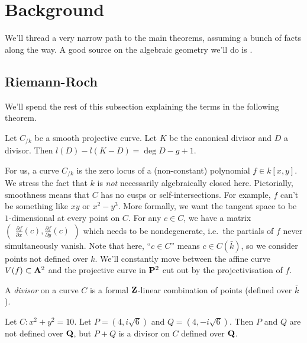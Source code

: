 
\section{Background}

We'll thread a very narrow path to the main theorems, assuming a bunch of 
facts along the way. A good source on the algebraic geometry we'll do is
\cite[ch.2,3]{silverman-2009}. 





\subsection{Riemann-Roch}

We'll spend the rest of this subsection explaining the terms in the following 
theorem. 

\begin{theorem}
Let $C_{/k}$ be a smooth projective curve. Let $K$ be the canonical divisor and 
$D$ a divisor. Then $l(D)-l(K-D)=\deg D-g+1$. 
\end{theorem}

For us, a curve $C_{/k}$ is the zero locus of a (non-constant) polynomial 
$f\in k[x,y]$. We stress the fact that $k$ is \emph{not} necessarily 
algebraically closed here. Pictorially, smoothness means that $C$ has no 
cusps or self-intersections. For example, $f$ can't be something like 
$x y$ or $x^2-y^3$. More formally, we want the tangent space to be 
$1$-dimensional at every point on $C$. For any $c\in C$, we have a 
matrix 
$\begin{pmatrix} \frac{\partial f}{\partial x}(c),\frac{\partial f}{\partial y}(c)\end{pmatrix}$
which needs to be nondegenerate, i.e.~the partials of $f$ never 
simultaneously vanish. Note that here, ``$c\in C$'' means $c\in C(\bar k)$, so 
we consider points not defined over $k$. We'll constantly move between the 
affine curve $V(f)\subset \mathbf{A}^2$ and the projective curve in $\mathbf{P}^2$ cut out by 
the projectivisation of $f$. 

A \emph{divisor} on a curve $C$ is a formal $\mathbf{Z}$-linear combination of points 
(defined over $\bar k$). 

\begin{example}
Let $C:x^2+y^2=10$. Let $P=(4,i\sqrt 6)$ and $Q=(4,-i\sqrt 6)$. Then $P$ and 
$Q$ are not defined over $\mathbf{Q}$, but $P+Q$ is a divisor on $C$ defined over 
$\mathbf{Q}$. 
\end{example}


